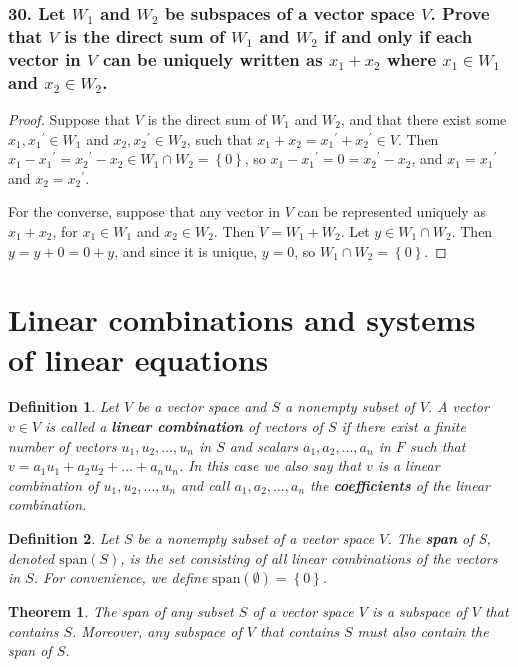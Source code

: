 \documentclass{article}
\newtheorem{theorem}{Theorem}
\newtheorem*{definition}{Definition}
\begin{document}
\subsubsection*{30. Let $W_1$ and $W_2$ be subspaces of a vector space $V$. Prove that $V$ is the direct sum of $W_1$ and $W_2$ if and only if each vector in $V$ can be uniquely written as $x_1 + x_2$ where $x_1 \in W_1$ and $x_2 \in W_2$.}
\begin{proof}
	Suppose that $V$ is the direct sum of $W_1$ and $W_2$, and that there exist some $x_1, {x_1}^\prime \in W_1$ and $x_2, {x_2}^\prime \in W_2$, such that $x_1 + x_2 = {x_1}^\prime + {x_2}^\prime \in V$. Then $x_1 - {x_1}^\prime = {x_2}^\prime - x_2 \in W_1 \cap W_2 = \left\{0\right\}$, so $x_1 - {x_1}^\prime = 0 = {x_2}^\prime - x_2$, and $x_1 = {x_1}^\prime$ and $x_2 = {x_2}^\prime$.

	For the converse, suppose that any vector in $V$ can be represented uniquely as $x_1 + x_2$, for $x_1 \in W_1$ and $x_2 \in W_2$. Then $V = W_1 + W_2$. Let $y \in W_1 \cap W_2$. Then $y = y + 0 = 0 + y$, and since it is unique, $y = 0$, so $W_1 \cap W_2 = \left\{0\right\}$.
\end{proof}

\section{Linear combinations and systems of linear equations}

\begin{definition}
	Let $V$ be a vector space and $S$ a nonempty subset of $V$. A vector $v \in V$ is called a \textbf{linear combination} of vectors of $S$ if there exist a finite number of vectors $u_1, u_2, \dots, u_n$ in $S$ and scalars $a_1, a_2, \dots, a_n$ in $F$ such that $v = a_1u_1 + a_2u_2 + \dots + a_nu_n$. In this case we also say that $v$ is a linear combination of $u_1, u_2, \dots, u_n$ and call $a_1, a_2, \dots, a_n$ the \textbf{coefficients} of the linear combination.
\end{definition}

\begin{definition}
	Let $S$ be a nonempty subset of a vector space $V$. The \textbf{span} of S, denoted $\text{span}(S)$, is the set consisting of all linear combinations of the vectors in $S$. For convenience, we define $\text{span}(\emptyset) = \left\{0\right\}$.
\end{definition}

\begin{theorem}
	The span of any subset $S$ of a vector space $V$ is a subspace of $V$ that contains $S$. Moreover, any subspace of $V$ that contains $S$ must also contain the span of $S$.
\end{theorem}
\end{document}

